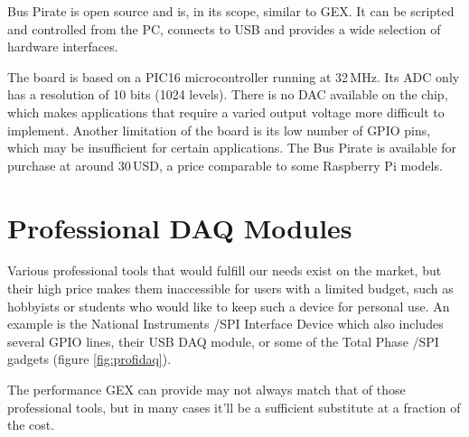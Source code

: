 Bus Pirate is open source and is, in its scope, similar to GEX. It can be scripted and controlled from the PC, connects to USB and provides a wide selection of hardware interfaces.

The board is based on a PIC16 microcontroller running at 32\,MHz. Its \gls{ADC} only has a resolution of 10 bits (1024 levels). There is no \gls{DAC} available on the chip, which makes applications that require a varied output voltage more difficult to implement. Another limitation of the board is its low number of \gls{GPIO} pins, which may be insufficient for certain applications. The Bus Pirate is available for purchase at around 30\,USD, a price comparable to some Raspberry Pi models.

\section{Professional DAQ Modules}

Various professional tools that would fulfill our needs exist on the market, but their high price makes them inaccessible for users with a limited budget, such as hobbyists or students who would like to keep such a device for personal use. An example is the National Instruments \IIC/SPI Interface Device which also includes several \gls{GPIO} lines, their USB DAQ module, or some of the Total Phase \IIC/SPI gadgets (figure \ref{fig:profidaq}). 

The performance GEX can provide may not always match that of those professional tools, but in many cases it'll be a sufficient substitute at a fraction of the cost.


